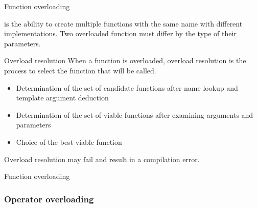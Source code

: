 \begin{frame}{Function overloading}{}
  \begin{definition}
     is the ability to create multiple functions with the same name with different implementations. Two overloaded function must differ by the type of their parameters.
  \end{definition}

  \begin{block}{Overload resolution}
    When a function is overloaded, overload resolution is the process to select the function that will be called.
    \begin{itemize}
    \item
      Determination of the set of candidate functions after name lookup and template argument deduction
    \item
      Determination of the set of viable functions after examining arguments and parameters
    \item
      Choice of the best viable function
    \end{itemize}
    Overload resolution may fail and result in a compilation error.
  \end{block}
\end{frame}

\begin{frame}{Function overloading}{}
  \begin{example}
  \end{example}
\end{frame}

\subsubsection{Operator overloading}

